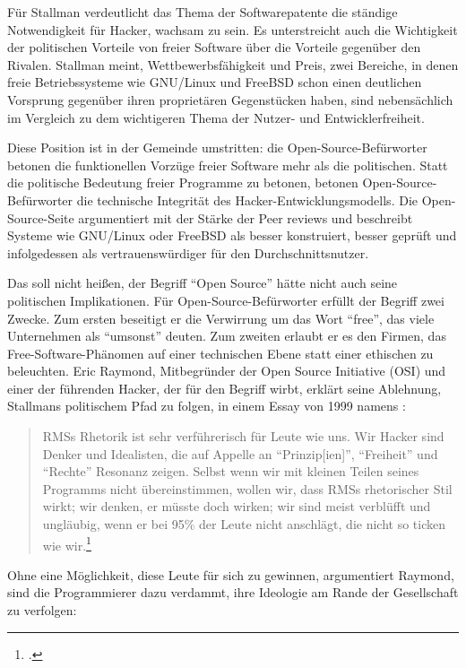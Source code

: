 Für Stallman verdeutlicht das Thema der Softwarepatente die ständige Notwendigkeit für Hacker, wachsam zu sein. Es unterstreicht auch die Wichtigkeit der politischen Vorteile von freier Software über die Vorteile gegenüber den Rivalen. Stallman meint, Wettbewerbsfähigkeit und Preis, zwei Bereiche, in denen freie Betriebssysteme wie GNU/Linux und FreeBSD schon einen deutlichen Vorsprung gegenüber ihren proprietären Gegenstücken haben, sind nebensächlich im Vergleich zu dem wichtigeren Thema der Nutzer- und Entwicklerfreiheit.

Diese Position ist in der Gemeinde umstritten: die Open-Source-Befürworter betonen die funktionellen Vorzüge freier Software mehr als die politischen. Statt die politische Bedeutung freier Programme zu betonen, betonen Open-Source-Befürworter die technische Integrität des Hacker-Entwicklungsmodells. Die Open-Source-Seite argumentiert mit der Stärke der Peer reviews und beschreibt Systeme wie GNU/Linux oder FreeBSD als besser konstruiert, besser geprüft und infolgedessen als vertrauenswürdiger für den Durchschnittsnutzer.

Das soll nicht heißen, der Begriff "`Open Source"' hätte nicht auch seine politischen Implikationen. Für Open-Source-Befürworter erfüllt der Begriff zwei Zwecke. Zum ersten beseitigt er die Verwirrung um das Wort "`free"', das viele Unternehmen als "`umsonst"' deuten. Zum zweiten erlaubt er es den Firmen, das Free-Software-Phänomen auf einer technischen Ebene statt einer ethischen zu beleuchten. Eric Raymond, Mitbegründer der Open Source Initiative (OSI) und einer der führenden Hacker, der für den Begriff wirbt, erklärt seine Ablehnung, Stallmans politischem Pfad zu folgen, in einem Essay von 1999 namens :

\begin{quote}
RMSs Rhetorik ist sehr verführerisch für Leute wie uns. Wir Hacker sind Denker und Idealisten, die auf Appelle an "`Prinzip[ien]"', "`Freiheit"' und "`Rechte"' Resonanz zeigen. Selbst wenn wir mit kleinen Teilen seines Programms nicht übereinstimmen, wollen wir, dass RMSs rhetorischer Stil wirkt; wir denken, er müsste doch wirken; wir sind meist verblüfft und ungläubig, wenn er bei 95\% der Leute nicht anschlägt, die nicht so ticken wie wir.\footcite[Vgl.][]{esrshutup}
\end{quote}

Ohne eine Möglichkeit, diese Leute für sich zu gewinnen, argumentiert Raymond, sind die Programmierer dazu verdammt, ihre Ideologie am Rande der Gesellschaft zu verfolgen:

